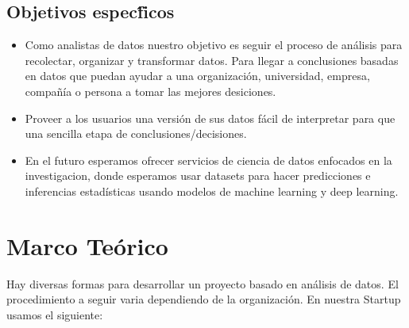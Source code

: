 \documentclass[12pt,a4paper,openright]{article}
\begin{document}
\subsection{Objetivos espec\'ficos}
\begin{itemize}
    \item Como analistas de datos nuestro objetivo es seguir el proceso de an\'alisis para recolectar, organizar y transformar datos. Para llegar a conclusiones basadas en datos que puedan ayudar a una organizaci\'on, universidad, empresa, compañ\'ia o persona a tomar las mejores desiciones.
    \item Proveer a los usuarios una versi\'on de sus datos f\'acil de interpretar para que una sencilla etapa de conclusiones/decisiones.
    \item En el futuro esperamos ofrecer servicios de ciencia de datos enfocados en la investigacion, donde esperamos usar datasets para hacer predicciones e inferencias estad\'isticas usando modelos de machine learning y deep learning.

\end{itemize}


\section{Marco Te\'orico}
Hay diversas formas para desarrollar un proyecto basado en an\'alisis de datos. El procedimiento a seguir varia dependiendo de la organizaci\'on. En nuestra Startup usamos el siguiente:
\end{document}
